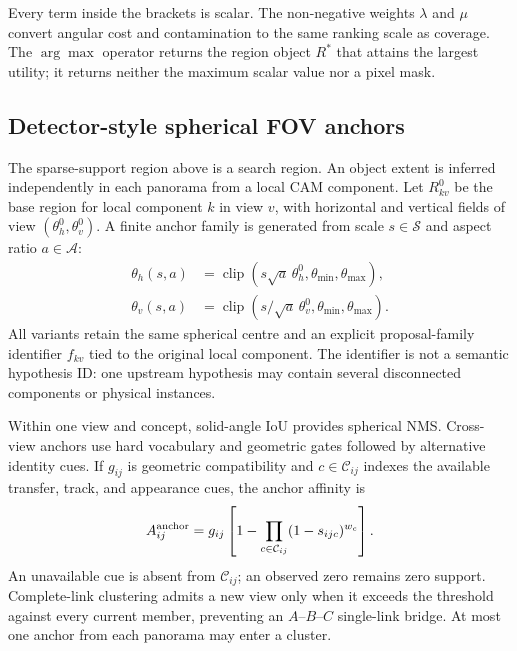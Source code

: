 \documentclass[a4paper,9pt]{extarticle}
\newcommand{\clip}{\operatorname{clip}}
\begin{document}
Every term inside the brackets is scalar. The non-negative weights
$\lambda$ and $\mu$ convert angular cost and contamination to the same ranking
scale as coverage. The $\arg\max$ operator returns the region object $R^*$ that
attains the largest utility; it returns neither the maximum scalar value nor a
pixel mask.

\subsection{Detector-style spherical FOV anchors}

The sparse-support region above is a search region. An object extent is
inferred independently in each panorama from a local CAM component. Let
$R^0_{kv}$ be the base region for local component $k$ in view $v$, with
horizontal and vertical fields of view $(\theta^0_h,\theta^0_v)$. A finite
anchor family is generated from scale $s\in\mathcal S$ and aspect ratio
$a\in\mathcal A$:
\begin{align}
 \theta_h(s,a)&=\clip(s\sqrt a\,\theta^0_h,
 \theta_{\min},\theta_{\max}),\\
 \theta_v(s,a)&=\clip(s/\sqrt a\,\theta^0_v,
 \theta_{\min},\theta_{\max}).
 \label{eq:anchorfamily}
\end{align}
All variants retain the same spherical centre and an explicit proposal-family
identifier $f_{kv}$ tied to the original local component. The identifier is
not a semantic hypothesis ID: one upstream hypothesis may contain several
disconnected components or physical instances.

Within one view and concept, solid-angle IoU provides spherical NMS. Cross-view
anchors use hard vocabulary and geometric gates followed by alternative
identity cues. If $g_{ij}$ is geometric compatibility and
$c\in\mathcal C_{ij}$ indexes the available transfer, track, and appearance
cues, the anchor affinity is
\begin{equation}
 A^{\rm anchor}_{ij}=g_{ij}
 \left[1-\prod_{c\in\mathcal C_{ij}}(1-s_{ijc})^{w_c}\right].
 \label{eq:anchoraffinity}
\end{equation}
An unavailable cue is absent from $\mathcal C_{ij}$; an observed zero remains
zero support. Complete-link clustering admits a new view only when it exceeds
the threshold against every current member, preventing an $A$--$B$--$C$
single-link bridge. At most one anchor from each panorama may enter a cluster.
\end{document}

